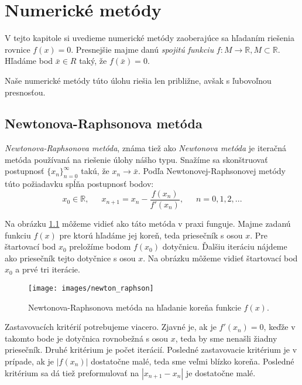 
\chapter{Numerické metódy}
\label{kap:numeric_methods}

V tejto kapitole si uvedieme numerické metódy zaoberajúce sa hľadaním riešenia rovnice $f(x) = 0$.
Presnejšie majme danú \textit{spojitú funkciu} $f: M \to \mathbb{R}, M \subset \mathbb{R}$. Hľadáme bod
$\bar{x} \in R$ taký, že $f(\bar{x}) = 0$.

Naše numerické metódy túto úlohu riešia len približne, avšak s ľubovoľnou presnosťou.

\section{Newtonova-Raphsonova metóda}

\textit{Newtonova-Raphsonova metóda}, známa tiež ako \textit{Newtonova metóda} je iteračná metóda používaná na riešenie
úlohy nášho typu. Snažíme sa skonštruovať postupnosť $\{x_n\}_{n=0}^\infty$ takú, že $x_n \to \bar{x}$.
Podľa Newtonovej-Raphsonovej metódy túto požiadavku spĺňa postupnosť bodov: 
$$x_0 \in \mathbb{R}, \,\,\,\,\,\,\,\,\, x_{n+1} = x_n - \frac{f(x_n)}{f'(x_n)}, \,\,\,\,\,\,\,\,\, n = 0, 1, 2, ...$$

Na obrázku \ref{obr:newton_raphson} môžeme vidieť ako táto metóda v praxi funguje. Majme zadanú funkciu
$f(x)$ pre ktorú hľadáme jej koreň, teda priesečník s osou $x$. Pre štartovací bod
$x_0$ preložíme bodom $f(x_0)$ dotyčnicu. Ďalšiu iteráciu nájdeme ako priesečník tejto 
dotyčnice s osou $x$. Na obrázku môžeme vidieť štartovací bod $x_0$ a prvé tri iterácie.

\begin{figure}
    \centerline{\texttt{[image: images/newton\_raphson]}}
    \caption[Newtonova-Raphsonova metóda]{Newtonova-Raphsonova metóda na hľadanie koreňa funkcie $f(x)$.}
    \label{obr:newton_raphson}
\end{figure}

Zastavovacích kritérií potrebujeme viacero. Zjavné je, ak je $f'(x_n) = 0$, keďže v takomto bode je dotyčnica rovnobežná
s osou $x$, teda by sme nenašli žiadny priesečník. Druhé kritérium je počet iterácií. 
Posledné zastavovacie kritérium je v prípade, ak je $|f(x_n)|$ dostatočne 
malé, teda sme veľmi blízko koreňa. Posledné kritérium sa dá tiež preformulovať na $|x_{n+1} - x_n|$ 
je dostatočne malé.

